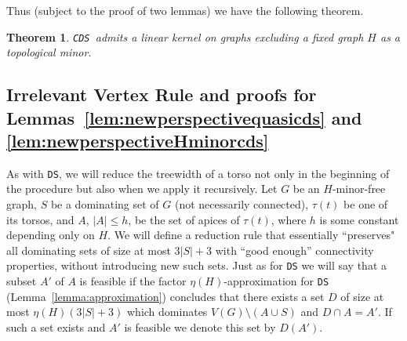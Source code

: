 \documentclass[11pt]{article}
\newtheorem{theorem}{Theorem}
\newcommand{\Hmf}{$H$-minor-free}
\newcommand{\tDS}{{\texttt{\sc DS}}}
\newcommand{\tCDS}{{\texttt{\sc CDS}}}
\begin{document}
Thus (subject to the proof of two lemmas) we have the following theorem. 
\begin{theorem}
\label{thm:lineardomsettopocds}
\tCDS \, admits a linear kernel on graphs excluding a fixed graph $H$ as a topological minor. 
\end{theorem}


\subsection{Irrelevant Vertex Rule and proofs for  Lemmas~\ref{lem:newperspectivequasicds} and \ref{lem:newperspectiveHminorcds} }


As with \tDS, we will reduce  the treewidth of a torso not only in the beginning of the procedure but also when we apply it recursively. 
Let $G$ be an \Hmf \,  graph, $S$ be a dominating set of $G$ (not necessarily connected), $\tau(t)$ be one of its torsos, and $A$, $|A|\leq h$,  be the set of apices of $\tau(t)$, where $h$ is some constant depending only on $H$. We will define a reduction rule that essentially ``preserves" all dominating sets of size at most $3|S|+3$ with ``good enough'' connectivity properties, without introducing new such sets. Just as for \tDS{} we will say that a subset $A'$ of $A$ is feasible if the factor $\eta(H)$-approximation for \tDS{} (Lemma~\ref{lemma:approximation})  concludes that there exists a set $D$ of size 
at most $\eta(H)(3|S|+3)$ which   dominates $V(G) \setminus (A \cup S)$ and $D \cap A = A'$. 
If such a set exists and $A'$ is feasible we denote this set by $D(A')$. 
\end{document}
